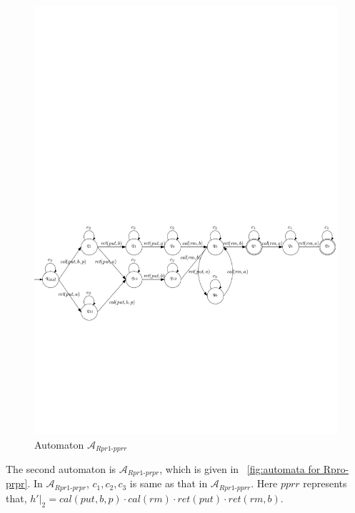 \begin{figure}[htbp]
  \centering
  \includegraphics[width=1 \textwidth]{PIC_AUTO_UNMATCHED_Rpr1-pprr.pdf}
  \caption{Automaton $\mathcal{A}_{\textit{Rpr1-pprr}}$}
  \label{fig:automata for Rpro-pprr}
\end{figure}


The second automaton is $\mathcal{A}_{\textit{Rpr1-prpr}}$, which is given in \figurename~\ref{fig:automata for Rpro-prpr}. In $\mathcal{A}_{\textit{Rpr1-prpr}}$, $c_1, c_2, c_3$ is same as that in $\mathcal{A}_{\textit{Rpr1-pprr}}$. Here $\textit{pprr}$ represents that, $h' \vert_{2} = \textit{cal}(\textit{put},b,p) \cdot \textit{cal}(\textit{rm}) \cdot \textit{ret}(\textit{put}) \cdot \textit{ret}(\textit{rm},b)$.

